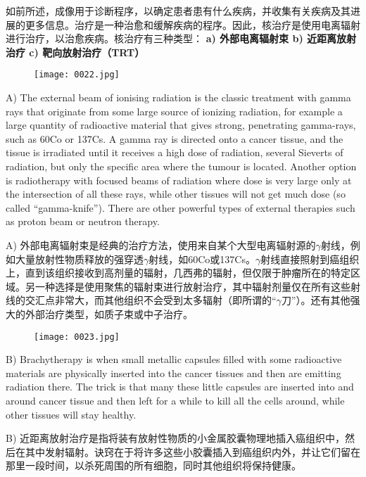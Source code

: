 \documentclass[dvipsnames, svgnames,a4paper,11pt]{article}
\begin{document}
如前所述，成像用于诊断程序，以确定患者患有什么疾病，并收集有关疾病及其进展的更多信息。治疗是一种治愈和缓解疾病的程序。因此，核治疗是使用电离辐射进行治疗，以治愈疾病。核治疗有三种类型： \textbf{a) 外部电离辐射束 b) 近距离放射治疗 c) 靶向放射治疗（TRT）}

\begin{figure}[htbp]
      \centering
      \texttt{[image: 0022.jpg]}
       \label{fig11}
  \end{figure}

A) The external beam of ionising radiation is the classic treatment with gamma rays that originate from some large source of ionizing radiation, for example a large quantity of radioactive material that gives strong, penetrating gamma-rays, such as 60Co or 137Cs. A gamma ray is directed onto a cancer tissue, and the tissue is irradiated until it receives a high dose of radiation, several Sieverts of radiation, but only the specific area where the tumour is located. Another option is radiotherapy with focused beams of radiation where dose is very large only at the intersection of all these rays, while other tissues will not get much dose (so called “gamma-knife”). There are other powerful types of external therapies such as proton beam or neutron therapy.

A) 外部电离辐射束是经典的治疗方法，使用来自某个大型电离辐射源的$\gamma$射线，例如大量放射性物质释放的强穿透$\gamma$射线，如60Co或137Cs。$\gamma$射线直接照射到癌组织上，直到该组织接收到高剂量的辐射，几西弗的辐射，但仅限于肿瘤所在的特定区域。另一种选择是使用聚焦的辐射束进行放射治疗，其中辐射剂量仅在所有这些射线的交汇点非常大，而其他组织不会受到太多辐射（即所谓的“$\gamma$刀”）。还有其他强大的外部治疗类型，如质子束或中子治疗。

\begin{figure}[htbp]
      \centering
      \texttt{[image: 0023.jpg]}
       \label{fig12}
  \end{figure}

B) Brachytherapy is when small metallic capsules filled with some radioactive materials are physically inserted into the cancer tissues and then are emitting radiation there. The trick is that many these little capsules are inserted into and around cancer tissue and then left for a while to kill all the cells around, while other tissues will stay healthy.

B) 近距离放射治疗是指将装有放射性物质的小金属胶囊物理地插入癌组织中，然后在其中发射辐射。诀窍在于将许多这些小胶囊插入到癌组织内外，并让它们留在那里一段时间，以杀死周围的所有细胞，同时其他组织将保持健康。
\end{document}
